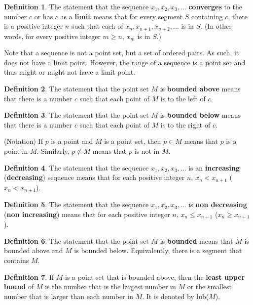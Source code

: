 \documentclass{article}
\theoremstyle{definition}
\newtheorem{definition}{Definition}
\begin{document}
\begin{definition}
The statement that the sequence $x_1, x_2, x_3, \dots$ \textbf{converges} to the number $c$ or has $c$ as a \textbf{limit} means that for every segment $S$ containing $c$, there is a positive integer $n$ such that each of $x_n, x_{n+1}, x_{n+2}, \dots$ is in $S$. (In other words, for every positive integer $m \geq n$, $x_m$ is in $S$.)
\end{definition}

Note that a sequence is not a point set, but a set of ordered pairs. As such, it does not have a limit point. However, the range of a sequence is a point set and thus might or might not have a limit point.

\begin{definition}
The statement that the point set $M$ is \textbf{bounded above} means that there is a number $c$ such that each point of $M$ is to the left of $c$.
\end{definition}

\begin{definition}
The statement that the point set $M$ is \textbf{bounded below} means that there is a number $c$ such that each point of $M$ is to the right of $c$.
\end{definition}

(Notation)
If $p$ is a point and $M$ is a point set, then $p \in M$ means that $p$ is a point in $M$. Similarly, $p \notin M$ means that $p$ is not in $M$.

\begin{definition}
The statement that the sequence $x_1, x_2, x_3, \dots$ is an \textbf{increasing} (\textbf{decreasing}) sequence means that for each positive integer $n$, $x_n < x_{n+1}$ ($x_n < x_{n+1}$).
\end{definition}

\begin{definition}
The statement that the sequence $x_1, x_2, x_3, \dots$ is \textbf{non decreasing} (\textbf{non increasing}) means that for each positive integer $n$, $x_n \leq x_{n+1}$ ($x_n \geq x_{n+1}$).
\end{definition}

\begin{definition}
The statement that the point set $M$ is \textbf{bounded} means that $M$ is bounded above and $M$ is bounded below. Equivalently, there is a segment that contains $M$.
\end{definition}

\begin{definition}
If $M$ is a point set that is bounded above, then the \textbf{least upper bound} of $M$ is the number that is the largest number in $M$ or the smallest number that is larger than each number in $M$. It is denoted by lub($M$).
\end{definition}
\end{document}
